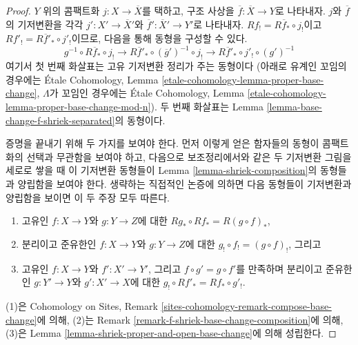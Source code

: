 \begin{proof}
$Y$ 위의 콤팩트화 $j : X \to \overline{X}$를 택하고,
구조 사상을 $\overline{f} : \overline{X} \to Y$로 나타내자.
$j$와 $\overline{f}$의 기저변환을 각각
$j' : X' \to \overline{X}'$와
$\overline{f}' : \overline{X}' \to Y'$로 나타내자.
$Rf_! = R\overline{f}_* \circ j_!$이고
$Rf'_! = R\overline{f}'_* \circ j'_!$이므로, 다음을 통해 동형을
구성할 수 있다.
$$
g^{-1} \circ R\overline{f}_* \circ j_! \to
R\overline{f}'_* \circ (\overline{g}')^{-1} \circ j_! \to
R\overline{f}'_* \circ j'_! \circ (g')^{-1} 
$$
여기서 첫 번째 화살표는 고유 기저변환 정리가 주는 동형이다
(아래로 유계인 꼬임의 경우에는 \'Etale Cohomology, Lemma
\ref{etale-cohomology-lemma-proper-base-change}, $\Lambda$가 꼬임인
경우에는 \'Etale Cohomology, Lemma
\ref{etale-cohomology-lemma-proper-base-change-mod-n}).
두 번째 화살표는 Lemma
\ref{lemma-base-change-f-shriek-separated}의 동형이다.

\medskip\noindent
증명을 끝내기 위해 두 가지를 보여야 한다. 먼저 이렇게 얻은 함자들의
동형이 콤팩트화의 선택과 무관함을 보여야 하고, 다음으로 보조정리에서와
같은 두 기저변환 그림을 세로로 쌓을 때 이 기저변환 동형들이 Lemma
\ref{lemma-shriek-composition}의 동형들과 양립함을 보여야 한다.
생략하는 직접적인 논증에 의하면 다음 동형들이 기저변환과 양립함을
보이면 이 두 주장 모두 따른다.
\begin{enumerate}
\item 고유인 $f : X \to Y$와 $g : Y \to Z$에 대한
$Rg_* \circ Rf_* = R(g \circ f)_*$,
\item 분리이고 준유한인 $f : X \to Y$와 $g : Y \to Z$에 대한
$g_! \circ f_! = (g \circ f)_!$, 그리고
\item 고유인 $f : X \to Y$와 $f' : X' \to Y'$, 그리고
$f \circ g' = g \circ f'$를 만족하며 분리이고 준유한인
$g : Y' \to Y$와 $g' : X' \to X$에 대한
$g_! \circ Rf'_* = Rf_* \circ g'_!$.
\end{enumerate}
(1)은 Cohomology on Sites, Remark
\ref{sites-cohomology-remark-compose-base-change}에 의해,
(2)는 Remark \ref{remark-f-shriek-base-change-composition}에 의해,
(3)은 Lemma \ref{lemma-shriek-proper-and-open-base-change}에 의해
성립한다.
\end{proof}

